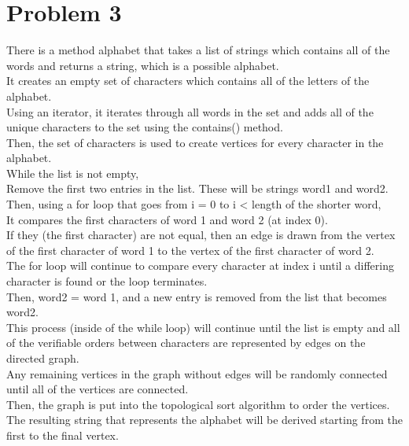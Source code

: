 \documentclass[14pt]{extarticle}
\begin{document}
\section*{Problem 3}
There is a method alphabet that takes a list of strings which contains all of the words and returns a string, which is a possible alphabet.\\
It creates an empty set of characters which contains all of the letters of the alphabet.\\
Using an iterator, it iterates through all words in the set and adds all of the unique characters to the set using the contains() method.\\
Then, the set of characters is used to create vertices for every character in the alphabet.\\
While the list is not empty, \\
Remove the first two entries in the list. These will be strings word1 and word2.\\
Then, using a for loop that goes from i = 0 to i < length of the shorter word, \\
It compares the first characters of word 1 and word 2 (at index 0). \\
If they (the first character) are not equal, then an edge is drawn from the vertex of the first character of word 1 to the vertex of the first character of word 2.\\
The for loop will continue to compare every character at index i until a differing character is found or the loop terminates.\\
Then, word2 = word 1, and a new entry is removed from the list that becomes word2.\\
This process (inside of the while loop) will continue until the list is empty and all of the verifiable orders between characters are represented by edges on the directed graph.\\
Any remaining vertices in the graph without edges will be randomly connected until all of the vertices are connected.\\
Then, the graph is put into the topological sort algorithm to order the vertices. \\
The resulting string that represents the alphabet will be derived starting from the first to the final vertex.\\
\end{document}
